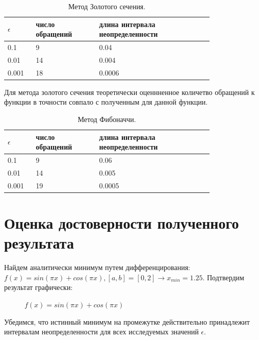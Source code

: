 \documentclass[main.tex]{subfiles}
\begin{document}
	\begin{table}[h]
		\begin{tabular} { | p{0.1\linewidth} | p{0.25\linewidth} | p{0.45\linewidth} |}
			\hline
			$\epsilon$ & число обращений & длина интервала неопределенности  \\ \hline
			0.1 & 9 & 0.04  \\ \hline
			0.01 & 14 & 0.004  \\ \hline
			0.001 & 18 & 0.0006   \\ \hline
		\end{tabular}
		\caption{Метод Золотого сечения.}
	\end{table}
	Для метода золотого сечения теоретически оценнненное количетво обращений к функции в точности совпало с полученным для данной функции.
	
	\begin{table}[h]
		\begin{tabular} { | p{0.1\linewidth} | p{0.25\linewidth} | p{0.45\linewidth} |}
			\hline
			$\epsilon$ & число обращений & длина интервала неопределенности  \\ \hline
			0.1 & 9 & 0.06  \\ \hline
			0.01 & 14 & 0.005 \\ \hline
			0.001 & 19 &  0.0005  \\ \hline
		\end{tabular}
		\caption{Метод Фибоначчи.}
	\end{table}
	
	
	\section{Оценка достоверности полученного результата}
	Найдем аналитически минимум путем дифференцирования:
	$f(x) = sin(\pi x) + cos(\pi x), [a, b] = [0, 2] \rightarrow x_{min} = 1.25.$
	Подтвердим результат графически:
	\begin{figure}[H]
		\caption{$f(x) = sin(\pi x) + cos(\pi x)$}
		\label{function2}
	\end{figure}
	Убедимся, что истинный минимум на промежутке действительно принадлежит интервалам неопределенности для всех исследуемых значений $\epsilon$.\\
	
\end{document}
